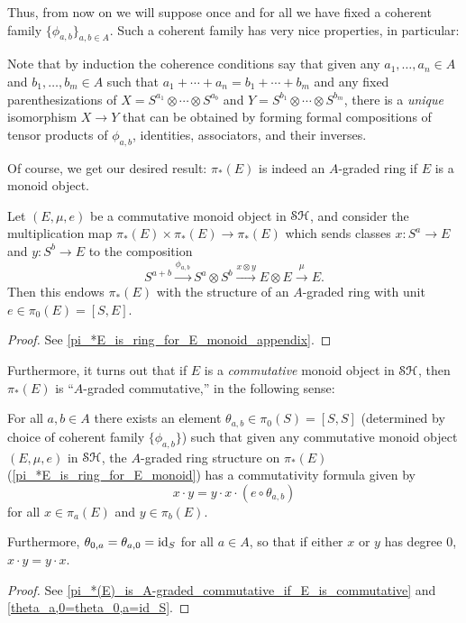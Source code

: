 \documentclass[../main.tex]{subfiles}
\begin{document}
Thus, from now on we will suppose once and for all we have fixed a coherent family $\{\phi_{a,b}\}_{a,b\in A}$. Such a coherent family has very nice properties, in particular:

\begin{remark}\label{unique_comp_Sas}
	Note that by induction the coherence conditions say that given any $a_1,\ldots,a_n\in A$ and $b_1,\ldots,b_m\in A$ such that $a_1+\cdots+a_n=b_1+\cdots+b_m$ and any fixed parenthesizations of $X=S^{a_1}\otimes\cdots\otimes S^{a_b}$ and $Y=S^{b_1}\otimes\cdots\otimes S^{b_m}$, there is a \emph{unique} isomorphism $X\to Y$ that can be obtained by forming formal compositions of tensor products of $\phi_{a,b}$, identities, associators, and their inverses.
\end{remark}

Of course, we get our desired result: $\pi_*(E)$ is indeed an $A$-graded ring if $E$ is a monoid object.

\begin{proposition}\label{pi_*E_is_ring_for_E_monoid}
	Let $(E,\mu,e)$ be a commutative monoid object in $\mathcal{SH}$, and consider the multiplication map $\pi_*(E)\times\pi_*(E)\to\pi_*(E)$ which sends classes $x:S^a\to E$ and $y:S^b\to E$ to the composition
	\[S^{a+b}\xrightarrow{\phi_{a,b}}S^a\otimes S^b\xrightarrow{x\otimes y}E\otimes E\xrightarrow\mu E.\]
	Then this endows $\pi_*(E)$ with the structure of an $A$-graded ring with unit $e\in\pi_0(E)=[S,E]$.
\end{proposition}
\begin{proof}
	See \autoref{pi_*E_is_ring_for_E_monoid_appendix}.
\end{proof}

Furthermore, it turns out that if $E$ is a \emph{commutative} monoid object in $\mathcal{SH}$, then $\pi_\ast(E)$ is ``$A$-graded commutative,'' in the following sense:

\begin{proposition}
	For all $a,b\in A$ there exists an element $\theta_{a,b}\in\pi_0(S)=[S,S]$ (determined by choice of coherent family $\{\phi_{a,b}\}$) such that given any commutative monoid object $(E,\mu,e)$ in $\mathcal{SH}$, the $A$-graded ring structure on $\pi_\ast(E)$ (\autoref{pi_*E_is_ring_for_E_monoid}) has a commutativity formula given by
	\[x\cdot y=y\cdot x\cdot (e\circ\theta_{a,b})\]
	for all $x\in\pi_a(E)$ and $y\in\pi_b(E)$.
	
	Furthermore, $\theta_{0,a}=\theta_{a,0}=\mathrm{id}_S$ for all $a\in A$, so that if either $x$ or $y$ has degree $0$, $x\cdot y=y\cdot x$.
\end{proposition}
\begin{proof}
	See \autoref{pi_*(E)_is_A-graded_commutative_if_E_is_commutative} and \autoref{theta_a,0=theta_0,a=id_S}.
\end{proof}
\end{document}
